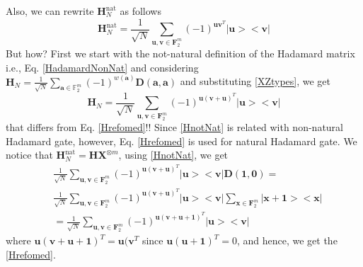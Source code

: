 \documentclass{article}
\begin{document}
Also, we can rewrite $\mathbf{H}_N^{\text{nat}}$ as follows
\begin{equation}\label{Hrefomed}
	\mathbf{H}_N^{\text{nat}} = \frac{1}{\sqrt{N}} \sum_{\mathbf{u}, \mathbf{v} \in \mathbf{F}_2^m}{\left(-1\right)^{\mathbf{u} \mathbf{v}^T } |\mathbf{u}><\mathbf{v}|}
\end{equation}
But how? First we start with the not-natural definition of the Hadamard matrix i.e., Eq. \ref{HadamardNonNat} and considering  $\mathbf{H}_N = \frac{1}{\sqrt{N}} \sum_{\mathbf{a} \in \mathbb{F}_2^m} (-1)^{w(\mathbf{a})} \mathbf{D}\left( \mathbf{a}, \mathbf{a} \right)$ and substituting \eqref{XZtypes}, we get
\begin{equation}\label{HnotNat}
	\mathbf{H}_N = \frac{1}{\sqrt{N}} \sum_{\mathbf{u}, \mathbf{v} \in \mathbf{F}_2^m}{\left(-1\right)^{\mathbf{u} (\mathbf{v+u})^T } |\mathbf{u}><\mathbf{v}|}
\end{equation}
that differs from	Eq. \eqref{Hrefomed}!! Since \eqref{HnotNat} is related with non-natural Hadamard gate, however, Eq. \eqref{Hrefomed} is used for natural Hadamard gate. We notice that $\mathbf{H}_N^{\text{nat}} = \mathbf{H}\mathbf{X}^{\otimes m}$, using \eqref{HnotNat}, we get
\begin{align*}
	&\frac{1}{\sqrt{N}} \sum_{\mathbf{u}, \mathbf{v} \in \mathbf{F}_2^m}{\left(-1\right)^{\mathbf{u} (\mathbf{v+u})^T } |\mathbf{u}><\mathbf{v}|}\mathbf{D}(\mathbf{1,0}) = \\
	& \frac{1}{\sqrt{N}} \sum_{\mathbf{u}, \mathbf{v} \in \mathbf{F}_2^m}{\left(-1\right)^{\mathbf{u} (\mathbf{v+u})^T } |\mathbf{u}><\mathbf{v}|}\sum_{\mathbf{x} \in \mathbf{F}_2^m}{ |\mathbf{x+1}><\mathbf{x}|} \\
	& =  \frac{1}{\sqrt{N}} \sum_{\mathbf{u}, \mathbf{v} \in \mathbf{F}_2^m}{\left(-1\right)^{\mathbf{u} (\mathbf{v+u+1})^T } |\mathbf{u}><\mathbf{v}|}
\end{align*}
where $\mathbf{u}(\mathbf{v+u+1})^T=\mathbf{u}(\mathbf{v}^T$ since $\mathbf{u}(\mathbf{u+1})^T=0$, and hence, we get the \eqref{Hrefomed}.
\end{document}
